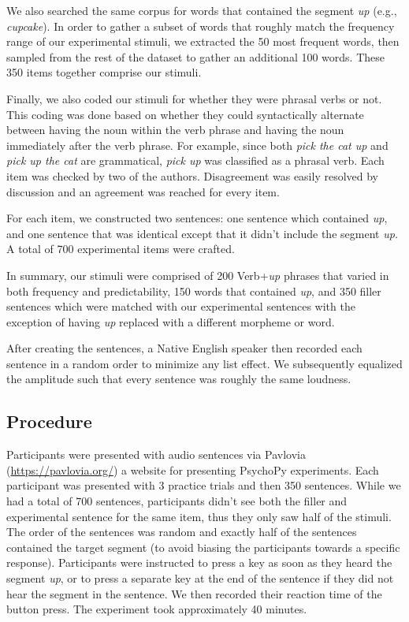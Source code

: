 \documentclass[
  man,floatsintext]{apa6}
\begin{document}
We also searched the same corpus for words that contained the segment \emph{up} (e.g., \emph{cupcake}). In order to gather a subset of words that roughly match the frequency range of our experimental stimuli, we extracted the 50 most frequent words, then sampled from the rest of the dataset to gather an additional 100 words. These 350 items together comprise our stimuli.

Finally, we also coded our stimuli for whether they were phrasal verbs or not. This coding was done based on whether they could syntactically alternate between having the noun within the verb phrase and having the noun immediately after the verb phrase. For example, since both \emph{pick the cat up} and \emph{pick up the cat} are grammatical, \emph{pick up} was classified as a phrasal verb. Each item was checked by two of the authors. Disagreement was easily resolved by discussion and an agreement was reached for every item.

For each item, we constructed two sentences: one sentence which contained \emph{up}, and one sentence that was identical except that it didn't include the segment \emph{up.} A total of 700 experimental items were crafted.

In summary, our stimuli were comprised of 200 Verb+\emph{up} phrases that varied in both frequency and predictability, 150 words that contained \emph{up}, and 350 filler sentences which were matched with our experimental sentences with the exception of having \emph{up} replaced with a different morpheme or word.

After creating the sentences, a Native English speaker then recorded each sentence in a random order to minimize any list effect. We subsequently equalized the amplitude such that every sentence was roughly the same loudness.

\subsection{Procedure}\label{procedure}

Participants were presented with audio sentences via Pavlovia (\url{https://pavlovia.org/}) a website for presenting PsychoPy experiments. Each participant was presented with 3 practice trials and then 350 sentences. While we had a total of 700 sentences, participants didn't see both the filler and experimental sentence for the same item, thus they only saw half of the stimuli. The order of the sentences was random and exactly half of the sentences contained the target segment (to avoid biasing the participants towards a specific response). Participants were instructed to press a key as soon as they heard the segment \emph{up}, or to press a separate key at the end of the sentence if they did not hear the segment in the sentence. We then recorded their reaction time of the button press. The experiment took approximately 40 minutes.
\end{document}

